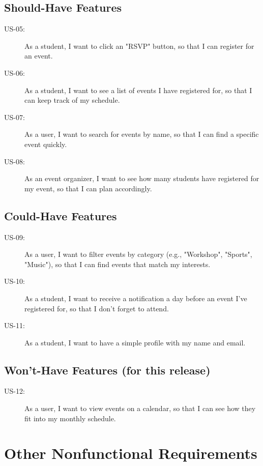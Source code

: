 \documentclass[11pt, a4paper]{article}
\begin{document}
\subsection{Should-Have Features}
\begin{description}
    \item[US-05:] As a student, I want to click an "RSVP" button, so that I can register for an event.
    \item[US-06:] As a student, I want to see a list of events I have registered for, so that I can keep track of my schedule.
    \item[US-07:] As a user, I want to search for events by name, so that I can find a specific event quickly.
    \item[US-08:] As an event organizer, I want to see how many students have registered for my event, so that I can plan accordingly.
\end{description}

\subsection{Could-Have Features}
\begin{description}
    \item[US-09:] As a user, I want to filter events by category (e.g., "Workshop", "Sports", "Music"), so that I can find events that match my interests.
    \item[US-10:] As a student, I want to receive a notification a day before an event I've registered for, so that I don't forget to attend.
    \item[US-11:] As a student, I want to have a simple profile with my name and email.
\end{description}

\subsection{Won't-Have Features (for this release)}
\begin{description}
    \item[US-12:] As a user, I want to view events on a calendar, so that I can see how they fit into my monthly schedule.
\end{description}

\section{Other Nonfunctional Requirements}
\end{document}
